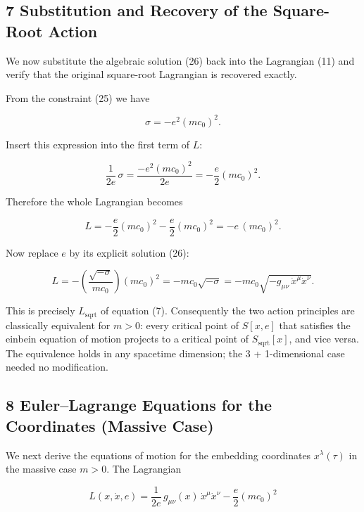 \documentclass[
]{article}
\begin{document}
\hypertarget{substitution-and-recovery-of-the-square-root-action}{%
\subsection{7 Substitution and Recovery of the Square-Root
Action}\label{substitution-and-recovery-of-the-square-root-action}}

We now substitute the algebraic solution (26) back into the Lagrangian
(11) and verify that the original square-root Lagrangian is recovered
exactly.

From the constraint (25) we have

\[\sigma = - e^{2} (mc_{0})^{2}. \tag{27}\]

Insert this expression into the first term of \(L\):

\[\frac{1}{2e}\, \sigma = \frac{-e^{2}(mc_{0})^{2}}{2e} = - \frac{e}{2}(mc_{0})^{2}. \tag{28}\]

Therefore the whole Lagrangian becomes

\[L = - \frac{e}{2}(mc_{0})^{2} - \frac{e}{2}(mc_{0})^{2} = - e\, (mc_{0})^{2}. \tag{29}\]

Now replace \(e\) by its explicit solution (26):

\[L = - \left( \frac{\sqrt{-\sigma}}{mc_{0}} \right) (mc_{0})^{2} = - mc_{0} \sqrt{-\sigma} = - mc_{0} \sqrt{-g_{\mu\nu}\, \dot{x}^{\mu} \dot{x}^{\nu}}. \tag{30}\]

This is precisely \(L_{\mathrm{sqrt}}\) of equation (7). Consequently
the two action principles are classically equivalent for \(m > 0\):
every critical point of \(S[x, e]\) that satisfies the einbein equation
of motion projects to a critical point of \(S_{\mathrm{sqrt}}[x]\), and
vice versa. The equivalence holds in any spacetime dimension; the 3 +
1-dimensional case needed no modification.

\hypertarget{eulerlagrange-equations-for-the-coordinates-massive-case}{%
\subsection{8 Euler--Lagrange Equations for the Coordinates (Massive
Case)}\label{eulerlagrange-equations-for-the-coordinates-massive-case}}

We next derive the equations of motion for the embedding coordinates
\(x^{\lambda}(\tau)\) in the massive case \(m > 0\). The Lagrangian

\[L(x, \dot{x}, e) = \frac{1}{2e}\, g_{\mu\nu}(x)\, \dot{x}^{\mu} \dot{x}^{\nu} - \frac{e}{2}(mc_{0})^{2} \tag{31}\]
\end{document}
